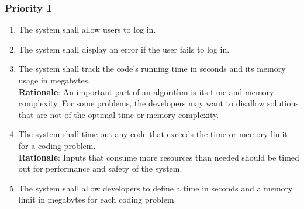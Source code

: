 \documentclass[12pt, titlepage]{article}
\begin{document}
\subsubsection{Priority 1}
\begin{enumerate}[label=FR.\arabic*, resume] 
    \item The system shall allow users to log in. \label{FR.13}
    \item The system shall display an error if the user fails to log in. \label{FR.14}
    \item The system shall track the code's running time in seconds and its memory usage in megabytes. \label{FR.15}\\
    \textbf{Rationale}: An important part of an algorithm is its time and memory complexity. For some problems, the developers may want to disallow solutions that are not of the optimal time or memory complexity.
    \item The system shall time-out any code that exceeds the time or memory limit for a coding problem. \label{FR.16} \\
     \textbf{Rationale}: Inputs that consume more resources than needed should be timed out for performance and safety of the system.  
    \item The system shall allow developers to define a time in seconds and a memory limit in megabytes for each coding problem. \label{FR.17}

\end{enumerate}
\end{document}

